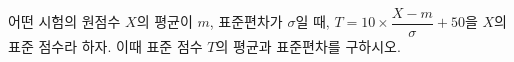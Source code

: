 어떤 시험의 원점수 $X$의 평균이 $m$, 표준편차가 $\sigma$일 때, $T=10\times\dfrac{X-m}{\sigma}+50$을 $X$의 표준 점수라 하자. 이때 표준 점수 $T$의 평균과 표준편차를 구하시오.
